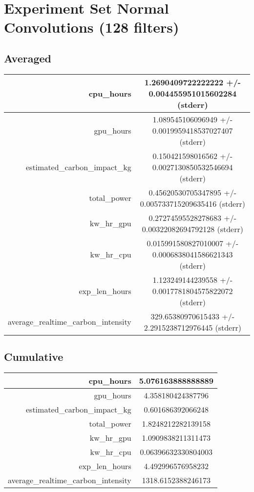 \documentclass{article}%
\begin{document}
%
\normalsize%
\section{Experiment Set Normal Convolutions (128 filters)}%
\label{sec:Experiment Set Normal Convolutions (128 filters)}%
\subsection{Averaged}%
\label{subsec:Averaged}%
\begin{tabular}{|r|c|}%
\hline%
cpu\_hours&1.2690409722222222 +/{-} 0.004455951015602284 (stderr)\\%
\hline%
gpu\_hours&1.089545106096949 +/{-} 0.0019959418537027407 (stderr)\\%
\hline%
estimated\_carbon\_impact\_kg&0.150421598016562 +/{-} 0.0027130850532546694 (stderr)\\%
\hline%
total\_power&0.45620530705347895 +/{-} 0.005733715209635416 (stderr)\\%
\hline%
kw\_hr\_gpu&0.27274595528278683 +/{-} 0.00322082694792128 (stderr)\\%
\hline%
kw\_hr\_cpu&0.015991580827010007 +/{-} 0.0006838041586621343 (stderr)\\%
\hline%
exp\_len\_hours&1.123249144239558 +/{-} 0.0017781804575822072 (stderr)\\%
\hline%
average\_realtime\_carbon\_intensity&329.65380970615433 +/{-} 2.2915238712976445 (stderr)\\%
\hline%
\end{tabular}

%
\subsection{Cumulative}%
\label{subsec:Cumulative}%
\begin{tabular}{|r|c|}%
\hline%
cpu\_hours&5.076163888888889\\%
\hline%
gpu\_hours&4.358180424387796\\%
\hline%
estimated\_carbon\_impact\_kg&0.601686392066248\\%
\hline%
total\_power&1.8248212282139158\\%
\hline%
kw\_hr\_gpu&1.0909838211311473\\%
\hline%
kw\_hr\_cpu&0.06396632330804003\\%
\hline%
exp\_len\_hours&4.492996576958232\\%
\hline%
average\_realtime\_carbon\_intensity&1318.6152388246173\\%
\hline%
\end{tabular}

%
\end{document}

